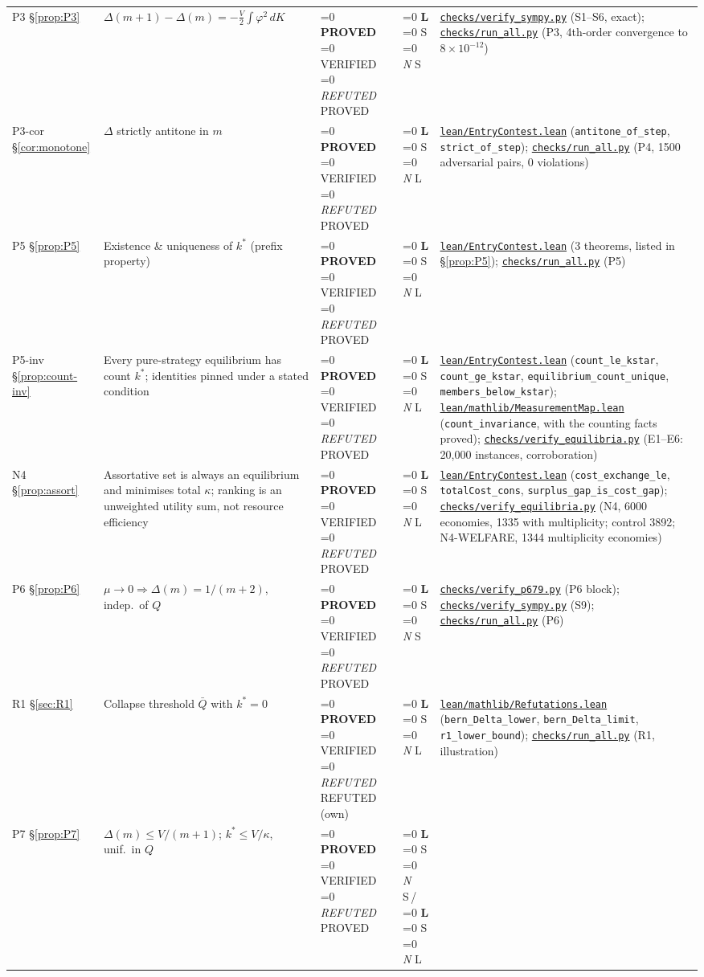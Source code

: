 \documentclass[11pt]{article}
\newcommand{\file}[1]{\href{run:#1}{\texttt{#1}}}
\newcommand{\status}[1]{%
  \ifnum\pdfstrcmp{#1}{PROVED}=0 \textbf{PROVED}%
  \else\ifnum\pdfstrcmp{#1}{VERIFIED}=0 VERIFIED%
  \else\ifnum\pdfstrcmp{#1}{REFUTED}=0 \emph{REFUTED}%
  \else #1\fi\fi\fi}
\newcommand{\tier}[1]{%
  \ifnum\pdfstrcmp{#1}{L}=0 \textbf{L}%
  \else\ifnum\pdfstrcmp{#1}{S}=0 S%
  \else\ifnum\pdfstrcmp{#1}{N}=0 \emph{N}%
  \else #1\fi\fi\fi}
\begin{document}
\begin{longtable}{@{}p{1.5cm}p{5.0cm}p{1.5cm}p{0.8cm}p{6.0cm}@{}}
P3 \S\ref{prop:P3} & $\Delta(m{+}1)-\Delta(m)=-\tfrac{V}{2}\!\int\!\varphi^2\,dK$ &
  \status{PROVED} & \tier{S} &
  \file{checks/verify\_sympy.py} (S1--S6, exact); \file{checks/run\_all.py} (P3, 4th-order convergence to $8\times10^{-12}$) \\[4pt]
P3-cor \S\ref{cor:monotone} & $\Delta$ strictly antitone in $m$ &
  \status{PROVED} & \tier{L} &
  \file{lean/EntryContest.lean} (\texttt{antitone\_of\_step}, \texttt{strict\_of\_step}); \file{checks/run\_all.py} (P4, 1500 adversarial pairs, 0 violations) \\[4pt]
P5 \S\ref{prop:P5} & Existence \& uniqueness of $k^*$ (prefix property) &
  \status{PROVED} & \tier{L} &
  \file{lean/EntryContest.lean} (3 theorems, listed in \S\ref{prop:P5}); \file{checks/run\_all.py} (P5) \\[4pt]
P5-inv \S\ref{prop:count-inv} & Every pure-strategy equilibrium has count $k^*$; identities pinned under a stated condition &
  \status{PROVED} & \tier{L} &
  \file{lean/EntryContest.lean} (\texttt{count\_le\_kstar}, \texttt{count\_ge\_kstar}, \texttt{equilibrium\_count\_unique}, \texttt{members\_below\_kstar}); \file{lean/mathlib/MeasurementMap.lean} (\texttt{count\_invariance}, with the counting facts proved); \file{checks/verify\_equilibria.py} (E1--E6: 20{,}000 instances, corroboration) \\[4pt]
N4 \S\ref{prop:assort} & Assortative set is always an equilibrium and minimises total $\kappa$; ranking is an unweighted utility sum, not resource efficiency &
  \status{PROVED} & \tier{L} &
  \file{lean/EntryContest.lean} (\texttt{cost\_exchange\_le}, \texttt{totalCost\_cons}, \texttt{surplus\_gap\_is\_cost\_gap}); \file{checks/verify\_equilibria.py} (N4, 6000 economies, 1335 with multiplicity; control 3892; N4-WELFARE, 1344 multiplicity economies) \\[4pt]
P6 \S\ref{prop:P6} & $\mu\to0\Rightarrow\Delta(m)=1/(m{+}2)$, indep.\ of $Q$ &
  \status{PROVED} & \tier{S} &
  \file{checks/verify\_p679.py} (P6 block); \file{checks/verify\_sympy.py} (S9); \file{checks/run\_all.py} (P6) \\[4pt]
R1 \S\ref{sec:R1} & Collapse threshold $\bar Q$ with $k^*=0$ &
  \status{REFUTED} (own) & \tier{L} &
  \file{lean/mathlib/Refutations.lean} (\texttt{bern\_Delta\_lower}, \texttt{bern\_Delta\_limit}, \texttt{r1\_lower\_bound}); \file{checks/run\_all.py} (R1, illustration) \\[4pt]
P7 \S\ref{prop:P7} & $\Delta(m)\le V/(m{+}1)$; $k^*\le V/\kappa$, unif.\ in $Q$ &
  \status{PROVED} & \tier{S}\,/\,\tier{L} &

\end{longtable}
\end{document}

